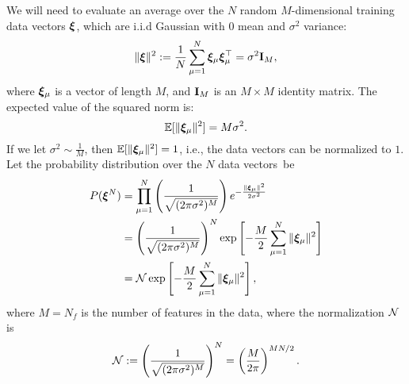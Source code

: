 We will need to evaluate an average over the $N$ random $M$-dimensional training data vectors $\boldsymbol{\xi}$,
which are i.i.d Gaussian with $0$ mean and $\sigma^{2}$ variance:
\begin{equation}
  \label{eqn:XInorm}
  \Vert \boldsymbol{\xi} \Vert^2 :=\frac{1}{N} \sum_{\mu=1}^{N} \boldsymbol{\xi}_\mu \boldsymbol{\xi}_\mu^{\top} = \sigma^{2}\mathbf{I}_{M} ,
\end{equation}
where $\boldsymbol{\xi}_{\mu}$ is a vector of length $M$, and $\mathbf{I}_{M}$ is an $M \times M$ identity matrix.
%
The expected value of the squared norm is:
\begin{equation}
\mathbb{E}[\Vert \boldsymbol{\xi}_{\mu} \Vert^2] = M \sigma^2 .
\end{equation}
If we let $\sigma^{2}\sim\tfrac{1}{M}$, 
then $\mathbb{E}[\Vert \boldsymbol{\xi}_{\mu} \Vert^2]=1$, i.e., the data vectors can be normalized to $1$.
%
Let the probability distribution over the $N$ data vectors~be
\begin{align}
\nonumber
  P(\boldsymbol{\xi}^{N}) &= \prod_{\mu=1}^{N} \left( \frac{1}{\sqrt{(2 \pi \sigma^2)^M}} \right) e^{-\frac{\|\boldsymbol{\xi}_{\mu}\|^2}{2 \sigma^2}} \\ 
\nonumber
  &= \left( \frac{1}{\sqrt{(2 \pi \sigma^2)^M}} \right)^{N} \exp\left[-\frac{M}{2}\sum_{\mu=1}^{N}\|\boldsymbol{\xi}_{\mu}\|^2\right] \\ 
  \label{eqn:pndx_vec}
  &= \mathcal{N} \exp\left[-\frac{M}{2}\sum_{\mu=1}^{N}\|\boldsymbol{\xi}_{\mu}\|^2\right] ,
\end{align}
where $M=N_f$ is  the number of features in the data, where the normalization $\mathcal{N}$ is
\begin{align}
\label{eqn:xinorm}
\mathcal{N} 
:=\left( \frac{1}{\sqrt{(2 \pi \sigma^2)^M}} \right)^{N}
 =\left( \frac{M}{2\pi} \right)^{MN/2} .
\end{align}

